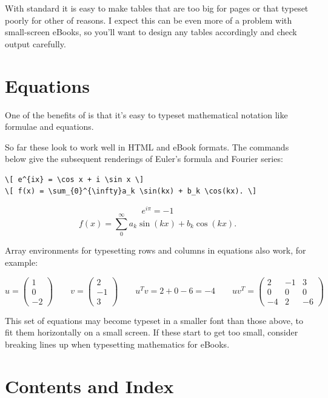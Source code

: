 With standard \latex it is easy to make tables that are too big for pages or that typeset poorly for other of reasons.
I expect this can be even more of a problem with small-screen eBooks, so you'll want to design any tables accordingly
and check output carefully.

\section{Equations}

One of the benefits of \latex is that it's easy to typeset mathematical notation like formulae and equations.

So far these look to work well in HTML and eBook formats. The commands below give the subsequent
renderings of Euler's formula and Fourier series:

\begin{verbatim}
\[ e^{ix} = \cos x + i \sin x \]
\[ f(x) = \sum_{0}^{\infty}a_k \sin(kx) + b_k \cos(kx). \]
\end{verbatim}

\[ e^{i\pi} = -1 \]
\[ f(x) = \sum_{0}^{\infty}a_k \sin(kx) + b_k \cos(kx). \]

Array environments for typesetting rows and columns in equations also work, for example:

\[
u = \left( \begin{array}{c} 1 \\ 0 \\ -2 \end{array} \right) \qquad
v = \left( \begin{array}{c} 2 \\ -1 \\ 3 \end{array} \right) \qquad
u^T v = 2 + 0 - 6 = -4 \qquad
u v^T = \left( \begin{array}{ccc} 2 & -1 & 3 \\ 0 & 0 & 0 \\ -4 & 2 & -6 \end{array} \right)
\]

This set of equations may become typeset in a smaller font than those above, to fit them
horizontally on a small screen. If these start to get too small, consider breaking lines up
when typesetting mathematics for eBooks.

\section{Contents and Index}

